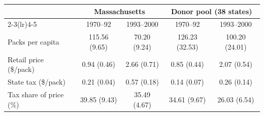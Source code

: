 \begin{tabular}{lcccc}
\toprule
 & \multicolumn{2}{c}{Massachusetts} & \multicolumn{2}{c}{Donor pool (38 states)} \\
\cmidrule(lr){2-3}\cmidrule(lr){4-5}
 & 1970--92 & 1993--2000 & 1970--92 & 1993--2000 \\
\midrule
Packs per capita & 115.56 (9.65) & 70.20 (9.24) & 126.23 (32.53) & 100.20 (24.01) \\
Retail price (\$/pack) & 0.94 (0.46) & 2.66 (0.71) & 0.85 (0.44) & 2.07 (0.54) \\
State tax (\$/pack) & 0.21 (0.04) & 0.57 (0.18) & 0.14 (0.07) & 0.26 (0.14) \\
Tax share of price (\%) & 39.85 (9.43) & 35.49 (4.67) & 34.61 (9.67) & 26.03 (6.54) \\
\bottomrule
\end{tabular}
